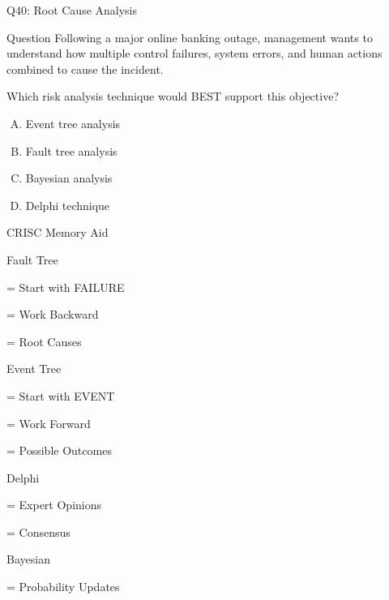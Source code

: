 \documentclass{beamer}
\begin{document}
	\begin{frame}[shrink=10]{Q40: Root Cause Analysis}
		\begin{block}{Question}
			Following a major online banking outage, management wants to
			understand how multiple control failures, system errors, and
			human actions combined to cause the incident.
			
			Which risk analysis technique would BEST support this objective?
		\end{block}
		
		\begin{enumerate}[(A)]
			\item Event tree analysis
			\item Fault tree analysis
			\item Bayesian analysis
			\item Delphi technique
		\end{enumerate}
				
		\begin{block}{CRISC Memory Aid}
			
			Fault Tree
			
			= Start with FAILURE
			
			= Work Backward
			
			= Root Causes
			
			\vspace{0.15cm}
			
			Event Tree
			
			= Start with EVENT
			
			= Work Forward
			
			= Possible Outcomes
			
			\vspace{0.15cm}
			
			Delphi
			
			= Expert Opinions
			
			= Consensus
			
			\vspace{0.15cm}
			
			Bayesian
			
			= Probability Updates
			
		\end{block}
		
	\end{frame}
	
\end{document}
